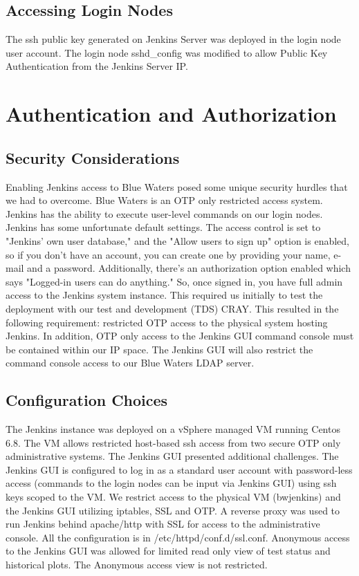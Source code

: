 \documentclass[10pt, conference, compsocconf]{IEEEtran}
\begin{document}
\subsection{Accessing Login Nodes}
The ssh public key generated on Jenkins Server was deployed in the login node user account. The login node sshd_config was modified to allow Public Key Authentication from the Jenkins Server IP.     


\section{Authentication and Authorization}
\label{sec:AuthenticationAuthorization}

\subsection{Security Considerations}
Enabling Jenkins access to Blue Waters posed some unique security hurdles that we had to overcome. Blue Waters is an OTP only restricted access system. Jenkins has the ability to execute user-level commands on our login nodes. Jenkins has some unfortunate default settings. The access control is set to "Jenkins' own user database," and the "Allow users to sign up" option is enabled, so if you don't have an account, you can create one by providing your name, e-mail and a password. Additionally, there's an authorization option enabled which says "Logged-in users can do anything." So, once signed in, you have full admin access to the Jenkins system instance.  This required us initially to test the deployment with our test and development (TDS) CRAY. This resulted in the following requirement: restricted OTP access to the physical system hosting Jenkins. In addition, OTP only access to the Jenkins GUI command console must be contained within our IP space.  The Jenkins GUI will also restrict the command console access to our Blue Waters LDAP server. 

\subsection{Configuration Choices}
The Jenkins instance was deployed on a vSphere managed VM running Centos 6.8. The VM allows restricted host-based ssh access from two secure OTP only administrative systems. The Jenkins GUI presented additional challenges. The Jenkins GUI is configured to log in as a standard user account with password-less access (commands to the login nodes can be input via Jenkins GUI) using ssh keys scoped to the VM. We restrict access to the physical VM (bwjenkins) and the Jenkins GUI utilizing iptables, SSL and OTP.  A reverse proxy was used to run Jenkins behind apache/http with SSL for access to the administrative console. All the configuration is in /etc/httpd/conf.d/ssl.conf. Anonymous access to the Jenkins GUI was allowed for limited read only view of test status and historical plots. The Anonymous access view is not restricted. 
\end{document}
